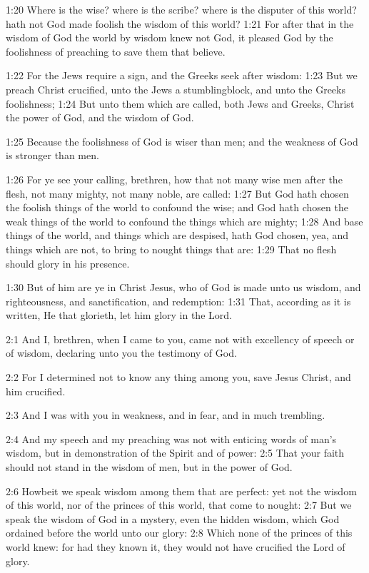 1:20 Where is the wise? where is the scribe? where is the disputer of this world? hath not God made foolish the wisdom of this world?  1:21 For after that in the wisdom of God the world by wisdom knew not God, it pleased God by the foolishness of preaching to save them that believe.

1:22 For the Jews require a sign, and the Greeks seek after wisdom: 1:23 But we preach Christ crucified, unto the Jews a stumblingblock, and unto the Greeks foolishness; 1:24 But unto them which are called, both Jews and Greeks, Christ the power of God, and the wisdom of God.

1:25 Because the foolishness of God is wiser than men; and the weakness of God is stronger than men.

1:26 For ye see your calling, brethren, how that not many wise men after the flesh, not many mighty, not many noble, are called: 1:27 But God hath chosen the foolish things of the world to confound the wise; and God hath chosen the weak things of the world to confound the things which are mighty; 1:28 And base things of the world, and things which are despised, hath God chosen, yea, and things which are not, to bring to nought things that are: 1:29 That no flesh should glory in his presence.

1:30 But of him are ye in Christ Jesus, who of God is made unto us wisdom, and righteousness, and sanctification, and redemption: 1:31 That, according as it is written, He that glorieth, let him glory in the Lord.

2:1 And I, brethren, when I came to you, came not with excellency of speech or of wisdom, declaring unto you the testimony of God.

2:2 For I determined not to know any thing among you, save Jesus Christ, and him crucified.

2:3 And I was with you in weakness, and in fear, and in much trembling.

2:4 And my speech and my preaching was not with enticing words of man's wisdom, but in demonstration of the Spirit and of power: 2:5 That your faith should not stand in the wisdom of men, but in the power of God.

2:6 Howbeit we speak wisdom among them that are perfect: yet not the wisdom of this world, nor of the princes of this world, that come to nought: 2:7 But we speak the wisdom of God in a mystery, even the hidden wisdom, which God ordained before the world unto our glory: 2:8 Which none of the princes of this world knew: for had they known it, they would not have crucified the Lord of glory.

